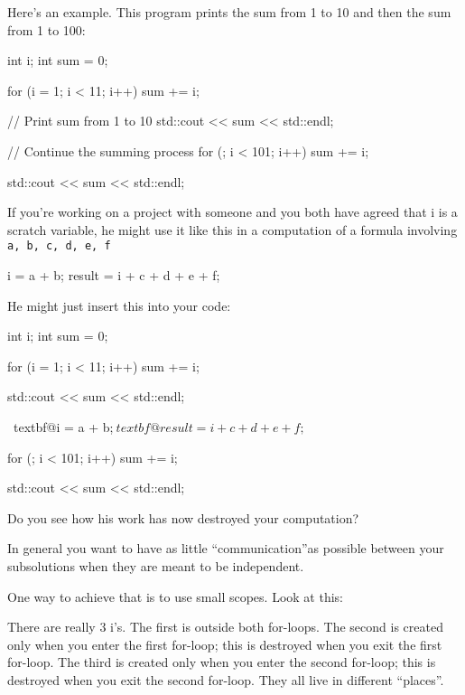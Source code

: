 Here's an example. This program prints the sum from 1 to
10 and then the sum from 1 to 100:
\begin{console}
int i;
int sum = 0;

for (i = 1; i < 11; i++)
{   
    sum += i;
}

// Print sum from 1 to 10
std::cout << sum << std::endl;

// Continue the summing process
for (; i < 101; i++)
{   
    sum += i;
}

std::cout << sum << std::endl;
\end{console}
If you're working on a project with someone and you both
have agreed that i is a scratch variable, he might use it like this in a
computation of a formula involving \texttt{a, b, c, d, e, f}
\begin{console}
i = a + b;
result = i + c + d + e + f;
\end{console}
He might just insert this into your code:
\begin{console}[commandchars=\~\@\$]
int i;
int sum = 0;

for (i = 1; i < 11; i++)
{   
    sum += i;
}

std::cout << sum << std::endl;

~textbf@i = a + b;$
~textbf@result = i + c + d + e + f;$

for (; i < 101; i++)
{   
    sum += i;
}

std::cout << sum << std::endl;
\end{console}

Do you see how his work has now destroyed your computation?

In general you want to have as little ``communication''as possible
between your subsolutions when they are meant to be independent.

One way to achieve that is to use small scopes. Look at this:
\begin{console}[commandchars=\~\@\$]
~EMPHASIZE@int i$;
int sum = 0;

for (~EMPHASIZE@int i = $}; i < 11; i++)
{   
    sum += i;
}

std::cout << sum << std::endl;

i = a + b;
result = i + c + d + e + f;

for (~EMPHASIZE@int i = 1$; i < 101; i++)
{   
    sum += i;
}

std::cout << sum << std::endl;
\end{console}

There are really 3 i's. The first is outside both
for-loops. The second is created only when you enter the first for-loop;
this is destroyed when you exit the first for-loop. The third is created
only when you enter the second for-loop; this is destroyed when you exit
the second for-loop. They all live in different ``places''.

